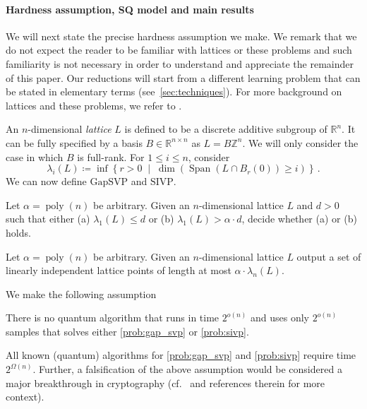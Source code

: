 \documentclass{theoretics}
\newcommand{\Paren}[1]{\left(#1\right)}
\newcommand{\Set}[1]{\left\{#1\right\}}
\newcommand{\suchthat}{\;\middle\vert\;}
\DeclareMathOperator{\poly}{poly}
\newcommand{\Z}{\mathbb Z}
\newcommand{\R}{\mathbb R}
\renewcommand{\leq}{\leqslant}
\renewcommand{\geq}{\geqslant}
\DeclareMathOperator{\Span}{Span}
\begin{document}
\paragraph{Hardness assumption, SQ model and main results}
We will next state the precise hardness assumption we make.
We remark that we do not expect the reader to be familiar with lattices or these problems and such familiarity is not necessary in order to understand and appreciate the remainder of this paper.
Our reductions will start from a different learning problem that can be stated in elementary terms (see~\cref{sec:techniques}).
For more background on lattices and these problems, we refer to \cite{peikert2016decade}.

An $n$-dimensional \emph{lattice} $L$ is defined to be a discrete additive subgroup of $\R^n$.
It can be fully specified by a basis $B \in \R^{n \times n}$ as $L = B \Z^{n}$.
We will only consider the case in which $B$ is full-rank.
For $1\leq i \leq n$, consider 
\[
    \lambda_i\Paren{L} \coloneqq \inf\Set{r > 0 \suchthat \dim\Paren{\Span\Paren{L \cap B_r(0)} \geq i}} \,.
\]
We can now define $\mathrm{GapSVP}$ and $\mathrm{SIVP}$.
\begin{problem}
    \label{prob:gap_svp}
    Let $\alpha = \poly(n)$ be arbitrary.
    Given an $n$-dimensional lattice $L$ and $d > 0$ such that either (a) $\lambda_1\Paren{L} \leq d$ or (b) $\lambda_1\Paren{L} > \alpha \cdot d$, decide whether (a) or (b) holds.
\end{problem}

\begin{problem}
    \label{prob:sivp}
    Let $\alpha = \poly(n)$ be arbitrary.
    Given an $n$-dimensional lattice $L$ output a set of linearly independent lattice points of length at most $\alpha \cdot \lambda_n\Paren{L}$.
\end{problem}

We make the following assumption
\begin{assumption}
    \label{assump:lattices}
    There is no quantum algorithm that runs in time $2^{o(n)}$ and uses only $2^{o(n)}$ samples that solves either \cref{prob:gap_svp} or \cref{prob:sivp}.
\end{assumption}
All known (quantum) algorithms for \cref{prob:gap_svp} and \cref{prob:sivp} require time $2^{\Omega(n)}$.
Further, a falsification of the above assumption would be considered a major breakthrough in cryptography (cf.~\cite{peikert2016decade} and references therein for more context).
\end{document}
